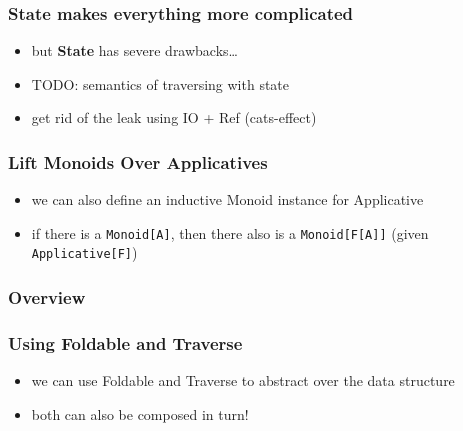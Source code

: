 \documentclass[aspectratio=169]{beamer}
\begin{document}
\begin{frame}[fragile]
  \frametitle{State makes everything more complicated}
  \begin{itemize}
  \item but \textbf{State} has severe drawbacks\dots
  \item TODO: semantics of traversing with state
  \item get rid of the leak using IO + Ref (cats-effect)
  \end{itemize}
\end{frame}

\begin{frame}
  \frametitle{Lift Monoids Over Applicatives}
  \begin{itemize}
  \item we can also define an inductive Monoid instance for Applicative
  \item if there is a \texttt{Monoid[A]}, then there also is a \texttt{Monoid[F[A]]} (given \texttt{Applicative[F]})
  \end{itemize}
\end{frame}

\begin{frame}
  \frametitle{Overview}
  \def\firstcircle{(0,0) ellipse (20mm and 5mm)}
  \def\secondcircle{(0,0) ellipse (25mm and 12mm)}
  \def\thirdcircle{(0,0) ellipse (35mm and 20mm)}
  \begin{center}
  \end{center}
\end{frame}

\begin{frame}
  \frametitle{Using Foldable and Traverse}
  \begin{itemize}
  \item we can use Foldable and Traverse to abstract over the data structure
  \item both can also be composed in turn!
  \end{itemize}
\end{frame}
\end{document}
